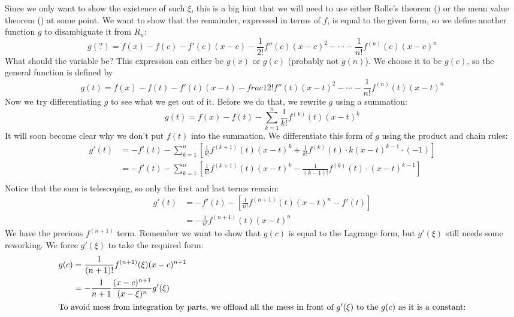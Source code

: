 \begin{intuition}
  Since we only want to show the existence of such $\xi$, this is a big hint that we will need to use either Rolle's theorem () or the mean value theorem () at some point. We want to show that the remainder, expressed in terms of $f$, is equal to the given form, so we define another function $g$ to disambiguate it from $R_n$:
  \[
    g(?) = f(x) - f(c) - f'(c)(x - c) - \frac{1}{2!} f''(c) (x - c) ^ 2 - \cdots - \frac{1}{n!} f ^ {(n)} (c) (x - c) ^ n
  \]
  What should the variable be? This expression can either be $g(x)$ or $g(c)$ (probably not $g(n)$). We choose it to be $g(c)$, so the general function is defined by 
  \[
    g(t) = f(x) - f(t) - f'(t)(x - t) - frac{1}{2!} f''(t) (x - t) ^ 2 - \cdots - \frac{1}{n!} f ^ {(n)} (t) (x - t) ^ n
  \]
  Now we try differentiating $g$ to see what we get out of it. Before we do that, we rewrite $g$ using a summation:
  \[
    g(t) = f(x) - f(t) - \sum_{k = 1}^{n} \frac{1}{k!} f ^ {(k)} (t) (x - t) ^ k
  \]
  It will soon become clear why we don't put $f(t)$ into the summation. We differentiate this form of $g$ using the product and chain rules:
  \begin{align*}
    g'(t) &= -f'(t) - \sum_{k = 1}^{n} \left[\frac{1}{k!} f ^ {(k + 1)} (t) (x - t) ^ k + \frac{1}{k!} f ^ {(k)} (t) \cdot k(x - t) ^ {k - 1} \cdot (-1)\right] \\
    &= -f'(t) - \sum_{k = 1}^{n} \left[\frac{1}{k!} f ^ {(k + 1)} (t) (x - t) ^ k - \frac{1}{(k - 1)!} f ^ {(k)} (t) \cdot (x - t) ^ {k - 1} \right] \\
  \end{align*}
  Notice that the sum is telescoping, so only the first and last terms remain:
  \begin{align*}
    g'(t) &= -f'(t) - \left[\frac{1}{n!} f ^ {(n + 1)} (t) (x - t) ^ n - f'(t)\right] \\ 
    &= -\frac{1}{n!} f ^ {(n + 1)} (t) (x - t) ^ n
  \end{align*}
  We have the precious $f ^ {(n + 1)}$ term. Remember we want to show that $g(c)$ is equal to the Lagrange form, but $g'(\xi)$ still needs some reworking. We force $g'(\xi)$ to take the required form:
  \begin{align*}
    g(c) &= \frac{1}{(n + 1)!} f ^ {(n + 1)} (\xi) (x - c) ^ {n + 1} \\ 
    &= -\frac{1}{n + 1} \frac{(x - c) ^ {n + 1}}{(x - \xi) ^ n} g'(\xi) \\ 
    \intertext{To avoid mess from integration by parts, we offload all the mess in front of $g'(\xi)$ to the $g(c)$ as it is a constant:}

\end{align*}
\end{intuition}
